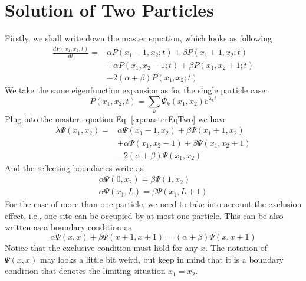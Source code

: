 \documentclass[12pt,a4paper]{article}
\begin{document}
\section{Solution of Two Particles}
\label{sec:solution_of_two_particles}
Firstly, we shall write down the master equation, which looks as following
\begin{equation}
    \begin{aligned}
    \label{eq:masterEqTwo}
    \frac{d P(x_1, x_2; t)}{dt} = & \alpha P(x_1-1,x_2;t) + \beta P(x_1+1,x_2;t) \\ 
    & + \alpha P(x_1, x_2-1; t) + \beta P(x_1, x_2+1; t)  \\ 
    & - 2(\alpha+\beta)P(x_1, x_2; t)
    \end{aligned}
\end{equation}
We take the same eigenfunction expansion as for the single particle case:
\begin{equation}
    \label{eq:solutionTwo}
    P(x_1, x_2, t) = \sum_{k} \Psi_{k}(x_1, x_2) e^{\lambda_k t}
\end{equation}
Plug into the master equation Eq. \eqref{eq:masterEqTwo} we have
\begin{equation}
    \begin{aligned}
    \label{eq:eigenModesTwo}
    \lambda \Psi(x_1, x_2) = & \alpha \Psi(x_1-1, x_2) + \beta \Psi(x_1+1, x_2)
    \\ &+ \alpha \Psi(x_1, x_2-1) + \beta \Psi(x_1, x_2+1) \\ 
    &- 2(\alpha+\beta)\Psi(x_1, x_2)
    \end{aligned}
\end{equation}
And the reflecting boundaries write as
\begin{subequations}
    \label{eq:boundaries-two-particles}
    \begin{eqnarray}
        \alpha \Psi(0,x_2) = \beta \Psi(1, x_2) \\
        \alpha \Psi(x_1, L) = \beta \Psi(x_1, L+1)
    \end{eqnarray}
\end{subequations}
For the case of more than one particle, we need to take into account the
exclusion effect, i.e., one site can be occupied by at most one particle.
This can be also written as a boundary condition as 
\begin{equation}
    \label{eq:exclusionCondition}
    \alpha \Psi(x, x) + \beta \Psi(x+1, x+1) = (\alpha + \beta) \Psi(x, x+1)
\end{equation}
Notice that the exclusive condition must hold for any $x$. The notation of $\Psi(x,
x)$ may looks a little bit weird, but keep in mind that it is a boundary condition
that denotes the limiting situation $x_1=x_2$.
\end{document}
